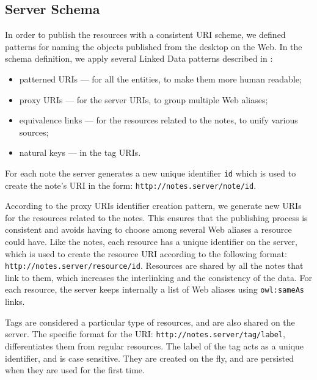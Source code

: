 \subsection{Server Schema}

In order to publish the resources with a consistent URI scheme, we defined patterns for naming the objects published from the desktop on the Web. In the schema definition, we apply several Linked Data patterns described in \cite{Dodds2010LDPBook}: 
\begin{itemize} 
 \item patterned URIs --- for all the entities, to make them more human readable; 
 \item proxy URIs --- for the server URIs, to group multiple Web aliases;
 \item equivalence links --- for the resources related to the notes, to unify various sources; 
 \item natural keys --- in the tag URIs. 
\end{itemize}

For each note the server generates a new unique identifier \verb|id| which is used to create the note's URI in the form: \verb|http://notes.server/note/id|.

According to the proxy URIs identifier creation pattern, we generate new URIs for the resources related to the notes. This ensures that the publishing process is consistent and avoids having to choose among several Web aliases a resource could have. Like the notes, each resource has a unique identifier on the server, which is used to create the resource URI according to the following format: \verb|http://notes.server/resource/id|. Resources are shared by all the notes that link to them, which increases the interlinking and the consistency of the data. For each resource, the server keeps internally a list of Web aliases using \verb|owl:sameAs| links.

Tags are considered a particular type of resources, and are also shared on the server. The specific format for the URI: \verb|http://notes.server/tag/label|, differentiates them from regular resources. The label of the tag acts as a unique identifier, and is case sensitive. They are created on the fly, and are persisted when they are used for the first time.
